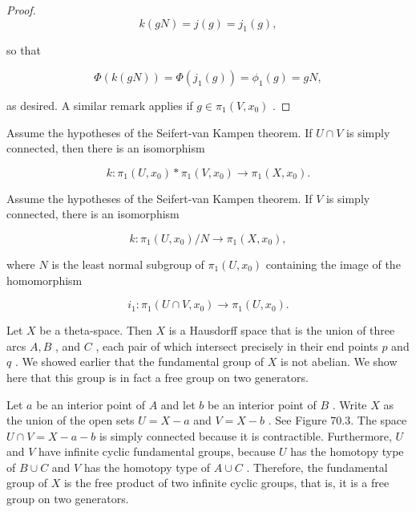 \begin{proof}
\[
k\left( {gN}\right)  = j\left( g\right)  = {j}_{1}\left( g\right) ,
\]

so that

\[
\Phi \left( {k\left( {gN}\right) }\right)  = \Phi \left( {{j}_{1}\left( g\right) }\right)  = {\phi }_{1}\left( g\right)  = {gN},
\]

as desired. A similar remark applies if \(g \in  {\pi }_{1}\left( {V,{x}_{0}}\right)\) .
\end{proof}
\begin{corollary} Assume the hypotheses of the Seifert-van Kampen theorem. If \(U \cap  V\) is simply connected, then there is an isomorphism

\[
k : {\pi }_{1}\left( {U,{x}_{0}}\right)  * {\pi }_{1}\left( {V,{x}_{0}}\right)  \rightarrow  {\pi }_{1}\left( {X,{x}_{0}}\right) .
\]
\end{corollary}

\begin{corollary} Assume the hypotheses of the Seifert-van Kampen theorem. If \(V\) is simply connected, there is an isomorphism

\[
k : {\pi }_{1}\left( {U,{x}_{0}}\right) /N \rightarrow  {\pi }_{1}\left( {X,{x}_{0}}\right) ,
\]

where \(N\) is the least normal subgroup of \({\pi }_{1}\left( {U,{x}_{0}}\right)\) containing the image of the homomorphism

\[
{i}_{1} : {\pi }_{1}\left( {U \cap  V,{x}_{0}}\right)  \rightarrow  {\pi }_{1}\left( {U,{x}_{0}}\right) .
\]
\end{corollary}

\begin{example} Let \(X\) be a theta-space. Then \(X\) is a Hausdorff space that is the union of three arcs \(A,B\) , and \(C\) , each pair of which intersect precisely in their end points \(p\) and \(q\) . We showed earlier that the fundamental group of \(X\) is not abelian. We show here that this group is in fact a free group on two generators.

Let \(a\) be an interior point of \(A\) and let \(b\) be an interior point of \(B\) . Write \(X\) as the union of the open sets \(U = X - a\) and \(V = X - b\) . See Figure 70.3. The space \(U \cap  V = X - a - b\) is simply connected because it is contractible. Furthermore, \(U\) and \(V\) have infinite cyclic fundamental groups, because \(U\) has the homotopy type of \(B \cup  C\) and \(V\) has the homotopy type of \(A \cup  C\) . Therefore, the fundamental group of \(X\) is the free product of two infinite cyclic groups, that is, it is a free group on two generators.
\end{example}

